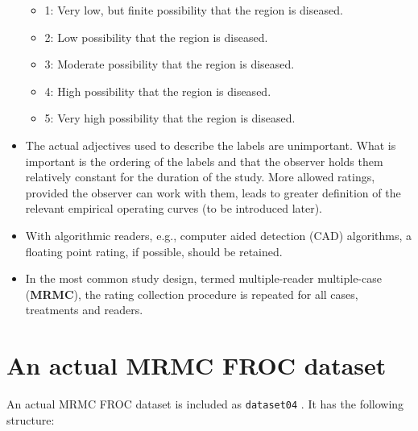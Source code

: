 \documentclass[]{book}
\newenvironment{Shaded}{\begin{snugshade}}{\end{snugshade}}
\newcommand{\CommentTok}[1]{\textcolor[rgb]{0.56,0.35,0.01}{\textit{#1}}}
\newcommand{\KeywordTok}[1]{\textcolor[rgb]{0.13,0.29,0.53}{\textbf{#1}}}
\newcommand{\NormalTok}[1]{#1}
\providecommand{\tightlist}{%
  \setlength{\itemsep}{0pt}\setlength{\parskip}{0pt}}
\begin{document}
\begin{itemize}
  \begin{itemize}
  \tightlist
  \item
    1: Very low, but finite possibility that the region is diseased.
  \item
    2: Low possibility that the region is diseased.
  \item
    3: Moderate possibility that the region is diseased.
  \item
    4: High possibility that the region is diseased.
  \item
    5: Very high possibility that the region is diseased.
  \end{itemize}
\item
  The actual adjectives used to describe the labels are unimportant. What is important is the ordering of the labels and that the observer holds them relatively constant for the duration of the study. More allowed ratings, provided the observer can work with them, leads to greater definition of the relevant empirical operating curves (to be introduced later).
\item
  With algorithmic readers, e.g., computer aided detection (CAD) algorithms, a floating point rating, if possible, should be retained.
\item
  In the most common study design, termed multiple-reader multiple-case (\textbf{MRMC}), the rating collection procedure is repeated for all cases, treatments and readers.
\end{itemize}

\hypertarget{an-actual-mrmc-froc-dataset}{%
\section{An actual MRMC FROC dataset}\label{an-actual-mrmc-froc-dataset}}

An actual MRMC FROC dataset is included as \texttt{dataset04} \citep{RN1882}. It has the following structure:

\begin{Shaded}
\end{Shaded}
\end{document}
